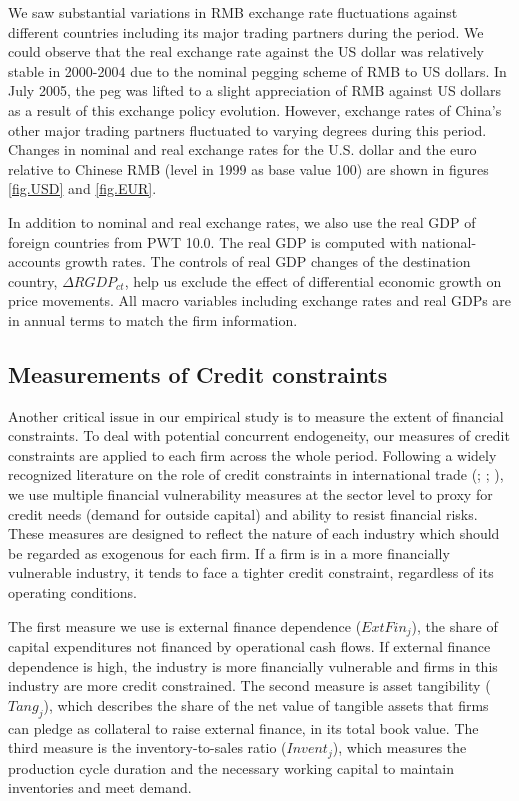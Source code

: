 \documentclass[12pt]{article}
\begin{document}
We saw substantial variations in RMB exchange rate fluctuations against different countries including its major trading partners during the period. We could observe that the real exchange rate against the US dollar was relatively stable in 2000-2004 due to the nominal pegging scheme of RMB to US dollars. In July 2005, the peg was lifted to a slight appreciation of RMB against US dollars as a result of this exchange policy evolution. However, exchange rates of China's other major trading partners fluctuated to varying degrees during this period. Changes in nominal and real exchange rates for the U.S. dollar and the euro relative to Chinese RMB (level in 1999 as base value 100) are shown in figures \ref{fig.USD} and \ref{fig.EUR}.

In addition to nominal and real exchange rates, we also use the real GDP of foreign countries from PWT 10.0. The real GDP is computed with national-accounts growth rates. The controls of real GDP changes of the destination country, $\Delta RGDP_{ct}$, help us exclude the effect of differential economic growth on price movements. All macro variables including exchange rates and real GDPs are in annual terms to match the firm information.

\subsection{Measurements of Credit constraints} \label{Credit Constraints}

Another critical issue in our empirical study is to measure the extent of financial constraints. To deal with potential concurrent endogeneity, our measures of credit constraints are applied to each firm across the whole period. Following a widely recognized literature on the role of credit constraints in international trade (\cite{kroszner2007}; \cite{manova-wei-zhang2015}; \cite{fan-lai-li2015}), we use multiple financial vulnerability measures at the sector level to proxy for credit needs (demand for outside capital) and ability to resist financial risks. These measures are designed to reflect the nature of each industry which should be regarded as exogenous for each firm. If a firm is in a more financially vulnerable industry, it tends to face a tighter credit constraint, regardless of its operating conditions.

The first measure we use is external finance dependence ($ExtFin_j$), the share of capital expenditures not financed by operational cash flows. If external finance dependence is high, the industry is more financially vulnerable and firms in this industry are more credit constrained. The second measure is asset tangibility ($Tang_j$), which describes the share of the net value of tangible assets that firms can pledge as collateral to raise external finance, in its total book value. The third measure is the inventory-to-sales ratio ($Invent_j$), which measures the production cycle duration and the necessary working capital to maintain inventories and meet demand.  
\end{document}
